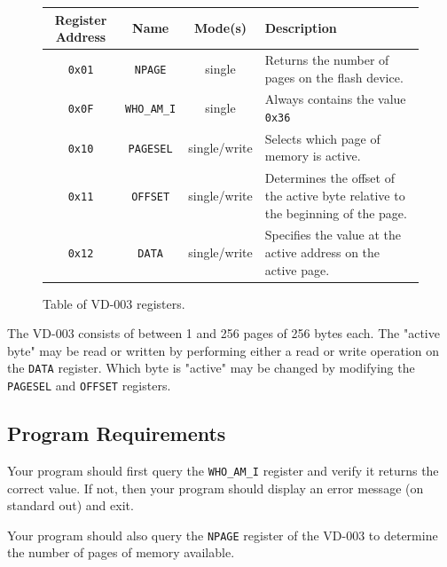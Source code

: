 \documentclass{article}
\begin{document}
\begin{figure}[H]

	\centering

	\begin{tabular}{c | c | c | p{}}

		Register Address & Name & Mode(s) & Description \\ \hline\hline

		\texttt{0x01} & \texttt{NPAGE} & single & Returns the number of pages on the flash device. \\ \hline

		\texttt{0x0F} & \texttt{WHO\_AM\_I} & single & Always contains the value \texttt{0x36} \\ \hline

		\texttt{0x10} & \texttt{PAGESEL} & single/write & Selects which page of memory is active. \\ \hline

		\texttt{0x11} & \texttt{OFFSET} & single/write & Determines the offset of the active byte relative to the beginning of the page. \\ \hline

		\texttt{0x12} & \texttt{DATA} & single/write & Specifies the value at the active address on the active page. \\


	\end{tabular}

	\caption{Table of VD-003 registers.}

\end{figure}

The VD-003 consists of between 1 and 256 pages of 256 bytes each. The "active
byte" may be read or written by performing either a read or write operation on
the \texttt{DATA} register. Which byte is "active" may be changed by modifying
the \texttt{PAGESEL} and \texttt{OFFSET} registers.

\subsection{Program Requirements}

Your program should first query the \texttt{WHO\_AM\_I} register and verify it
returns the correct value. If not, then your program should display an error
message (on standard out) and exit.

Your program should also query the \texttt{NPAGE} register of the VD-003 to
determine the number of pages of memory available.
\end{document}
